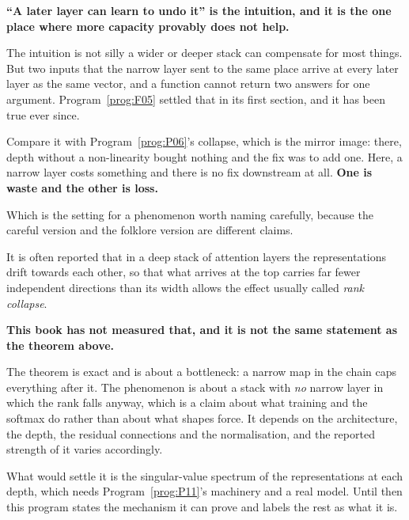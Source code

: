 \begin{fr}
\begin{trapbox}
\textbf{\enquote{A later layer can learn to undo it} is the intuition, and it
is the one place where more capacity provably does not help.}

The intuition is not silly \dash{} a wider or deeper stack can compensate for
most things. But two inputs that the narrow layer sent to the same place arrive
at every later layer as the same vector, and a function cannot return two
answers for one argument. Program~\ref{prog:F05} settled that in its first
section, and it has been true ever since.

Compare it with Program~\ref{prog:P06}'s collapse, which is the mirror image:
there, depth without a non-linearity bought nothing and the fix was to add one.
Here, a narrow layer costs something and there is no fix downstream at all.
\textbf{One is waste and the other is loss.}
\end{trapbox}
\end{fr}

\begin{fr}
Which is the setting for a phenomenon worth naming carefully, because the
careful version and the folklore version are different claims.

It is often reported that in a deep stack of attention layers the
representations drift towards each other, so that what arrives at the top
carries far fewer independent directions than its width allows \dash{} the
effect usually called \emph{rank collapse}.

\begin{warning}
\textbf{This book has not measured that, and it is not the same statement as
the theorem above.}

The theorem is exact and is about a bottleneck: a narrow map in the chain caps
everything after it. The phenomenon is about a stack with \emph{no} narrow
layer in which the rank falls anyway, which is a claim about what training and
the softmax do rather than about what shapes force. It depends on the
architecture, the depth, the residual connections and the normalisation, and
the reported strength of it varies accordingly.

What would settle it is the singular-value spectrum of the representations at
each depth, which needs Program~\ref{prog:P11}'s machinery and a real model.
Until then this program states the mechanism it can prove and labels the rest
as what it is.
\end{warning}
\end{fr}

